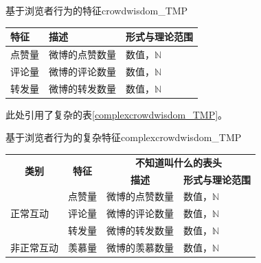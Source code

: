 \documentclass[a4paper,AutoFakeBold,oneside,12pt]{book}
\begin{document}
\begin{bupttable}{基于浏览者行为的特征}{crowdwisdom_TMP}

	\begin{tabular}{l|l|l}
		\hline \textbf{特征} & \textbf{描述}  & \textbf{形式与理论范围} \\
		\hline 点赞量        & 微博的点赞数量 & 数值，$\mathbb{N}$      \\
		\hline 评论量        & 微博的评论数量 & 数值，$\mathbb{N}$      \\
		\hline 转发量        & 微博的转发数量 & 数值，$\mathbb{N}$      \\
		\hline
	\end{tabular}
\end{bupttable}

此处引用了复杂的表\ref{complexcrowdwisdom_TMP}。


\begin{bupttable}{基于浏览者行为的复杂特征}{complexcrowdwisdom_TMP}
	\begin{tabular}{l|l|l|l}
		\hline
		\multicolumn{1}{c|}{\multirow{2}{*}{\textbf{类别}}} & \multicolumn{1}{c|}{\multirow{2}{*}{\textbf{特征}}} & \multicolumn{2}{c}{\textbf{不知道叫什么的表头}}                                               \\
		\cline{3-4}
		                                                    &                                                     & \multicolumn{1}{c|}{\textbf{描述}}              & \multicolumn{1}{c}{\textbf{形式与理论范围}} \\
		\hline
		\multirow{3}{*}{正常互动}                           & 点赞量                                              & 微博的点赞数量                                  & 数值，$\mathbb{N}$                          \\
		\cline{2-4}
		                                                    & 评论量                                              & 微博的评论数量                                  & 数值，$\mathbb{N}$                          \\
		\cline{2-4}
		                                                    & 转发量                                              & 微博的转发数量                                  & 数值，$\mathbb{N}$                          \\
		\hline
		非正常互动                                          & 羡慕量                                              & 微博的羡慕数量                                  & 数值，$\mathbb{N}$                          \\
		\hline
	\end{tabular}
\end{bupttable}
\end{document}
